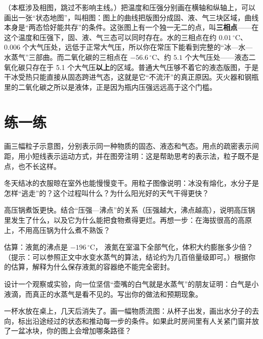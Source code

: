 \begin{tiaozhan}
（本框涉及相图，跳过不影响主线。）把温度和压强分别画在横轴和纵轴上，可以画出一张“状态地图”，叫相图：图上的曲线把版图分成固、液、气三块区域，曲线本身是“两态恰好能共存”的条件。这张图上有一个独一无二的点，叫\textbf{三相点}——在这个温度和压强下，固、液、气三态可以同时存在。水的三相点在约 $0.01\,^{\circ}\mathrm{C}$、$0.006$ 个大气压处，远低于正常大气压，所以你在常压下能看到完整的“冰—水—水蒸气”三部曲。而二氧化碳的三相点在 $-56.6\,^{\circ}\mathrm{C}$、约 $5.1$ 个大气压处——液态二氧化碳只存在于 5.1 个大气压\textbf{以上}的区域。普通大气压够不着它的液态版图，于是干冰受热只能直接从固态跨进气态，这就是它“不流汗”的真正原因。灭火器和钢瓶里的二氧化碳之所以是液体，正是因为瓶内压强远远高于这个门槛。
\end{tiaozhan}

\section*{练一练}

\begin{sikaoti}
\item 画三幅粒子示意图，分别表示同一种物质的固态、液态和气态。用点的疏密表示间距，用小短线表示运动方式，并在图旁注明：这是帮助思考的表示法，粒子既不是点，也不长这样。
\item 冬天结冰的衣服晾在室外也能慢慢变干。用粒子图像说明：冰没有熔化，水分子是怎样“逃走”的？这个过程叫什么？为什么阳光好的天气干得更快？
\item 高压锅煮饭更快。结合“压强—沸点”的关系（压强越大，沸点越高），说明高压锅里发生了什么，以及它为什么能把食物煮得更烂。再想一步：在海拔很高的高原上，不用高压锅为什么煮不熟饭？
\item 估算：液氮的沸点是 $-196\,^{\circ}\mathrm{C}$， 液氮在室温下全部气化，体积大约膨胀多少倍？（提示：可以参照正文中水变水蒸气的算法，结论约为几百倍量级即可。）根据你的估算，解释为什么保存液氮的容器绝不能完全密封。
\item 设计一个观察或实验，向一位坚信“壶嘴的白气就是水蒸气”的朋友证明：白气是小液滴，而真正的水蒸气是看不见的。写出你的做法和预期现象。
\item 一杯水放在桌上，几天后消失了。画一幅物质流图：从杯子出发，画出水分子的去向，标出沿途经过的状态和推动每一步的条件。如果此时房间里有人关紧门窗并放了一盆冰块，你的图上会增加哪条路径？
\end{sikaoti}
